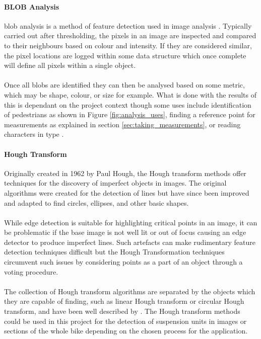 	\paragraph{BLOB Analysis}
		\gls{blob} analysis is a method of feature detection used in image analysis \citep{introtoprocessing}. Typically carried out after thresholding, the pixels in an image are inspected and compared to their neighbours based on colour and intensity. If they are considered similar, the pixel locations are logged within some data structure which once complete will define all pixels within a single object.
		\\\\
		Once all \glspl{blob} are identified they can then be analysed based on some metric, which may be shape, colour, or size for example. What is done with the results of this is dependant on the project context though some uses include identification of pedestrians as shown in Figure \ref{fig:analysis_uses}, finding a reference point for measurements as explained in section \ref{sec:taking_measurements}, or reading characters in type \citep{blob}.		
	\paragraph{Hough Transform}\label{sec:lit_review_hough}
		Originally created in 1962 by Paul Hough, the Hough transform methods offer techniques for the discovery of imperfect objects in images. The original algorithms were created for the detection of lines but have since been improved and adapted to find circles, ellipses, and other basic shapes. 
		\\\\
		While edge detection is suitable for highlighting critical points in an image, it can be problematic if the base image is not well lit or out of focus causing an edge detector to produce imperfect lines. Such artefacts can make rudimentary feature detection techniques difficult but the Hough Transformation techniques circumvent such issues by considering points as a part of an object through a voting procedure.
		\\\\
		The collection of Hough transform algorithms are separated by the objects which they are capable of finding, such as linear Hough transform or circular Hough transform, and have been well described by \cite{hough}. The Hough transform methods could be used in this project for the detection of suspension units in images or sections of the whole bike depending on the chosen process for the application.	
